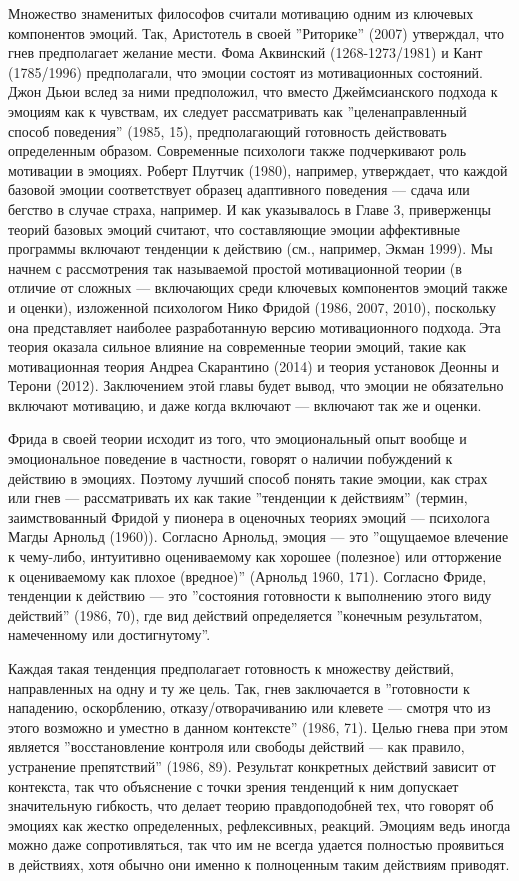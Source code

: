 \documentclass[11pt]{book}
\begin{document}
Множество знаменитых философов считали мотивацию одним из ключевых компонентов эмоций. Так, Аристотель в своей ''Риторике'' (2007) утверждал, что гнев предполагает желание мести. Фома Аквинский (1268-1273/1981) и Кант (1785/1996) предполагали, что эмоции состоят из мотивационных состояний. Джон Дьюи вслед за ними предположил, что вместо Джеймсианского подхода к эмоциям как к чувствам, их следует рассматривать как ''целенаправленный способ поведения'' (1985, 15), предполагающий готовность действовать определенным образом. Современные психологи также подчеркивают роль мотивации в эмоциях. Роберт Плутчик (1980), например, утверждает, что каждой базовой эмоции соответствует образец адаптивного поведения --- сдача или бегство в случае страха, например. И как указывалось в Главе 3, приверженцы теорий базовых эмоций считают, что составляющие эмоции аффективные программы включают тенденции к действию (см., например, Экман 1999). Мы начнем с рассмотрения так называемой простой мотивационной теории (в отличие от сложных --- включающих среди ключевых компонентов эмоций также и оценки), изложенной психологом Нико Фридой (1986, 2007, 2010), поскольку она представляет наиболее разработанную версию мотивационного подхода. Эта теория оказала сильное влияние на современные теории эмоций, такие как мотивационная теория Андреа Скарантино (2014) и теория установок Деонны и Терони (2012). Заключением этой главы будет вывод, что эмоции не обязательно включают мотивацию, и даже когда включают --- включают так же и оценки.

Фрида в своей теории исходит из того, что эмоциональный опыт вообще и эмоциональное поведение в частности, говорят о наличии побуждений к действию в эмоциях. Поэтому лучший способ понять такие эмоции, как страх или гнев --- рассматривать их как такие ''тенденции к действиям'' (термин, заимствованный Фридой у пионера в оценочных теориях эмоций --- психолога Магды Арнольд (1960)). Согласно Арнольд, эмоция --- это ''ощущаемое влечение к чему-либо, интуитивно оцениваемому как хорошее (полезное) или отторжение к оцениваемому как плохое (вредное)'' (Арнольд 1960, 171). Согласно Фриде, тенденции к действию --- это ''состояния готовности к выполнению этого виду действий'' (1986, 70), где вид действий определяется ''конечным результатом, намеченному или достигнутому''.

Каждая такая тенденция предполагает готовность к множеству действий, направленных на одну и ту же цель. Так, гнев заключается в ''готовности к нападению, оскорблению, отказу/отворачиванию или клевете --- смотря что из этого возможно и уместно в данном контексте'' (1986, 71). Целью гнева при этом является ''восстановление контроля или свободы действий --- как правило, устранение препятствий'' (1986, 89). Результат конкретных действий зависит от контекста, так что объяснение с точки зрения тенденций к ним допускает значительную гибкость, что делает теорию правдоподобней тех, что говорят об эмоциях как жестко определенных, рефлексивных, реакций. Эмоциям ведь иногда можно даже сопротивляться, так что им не всегда удается полностью проявиться в действиях, хотя обычно они именно к полноценным таким действиям приводят.
\end{document}
